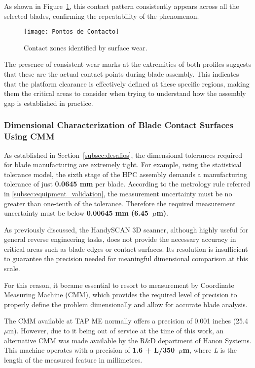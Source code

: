 As shown in Figure~\ref{fig:contact}, this contact pattern consistently appears across all the selected blades, confirming the repeatability of the phenomenon. 

\begin{figure}[H]
    \centering
    \texttt{[image: Pontos de Contacto]}
    \caption{Contact zones identified by surface wear.}
    \label{fig:contact}
\end{figure}

The presence of consistent wear marks at the extremities of both profiles suggests that these are the actual contact points during blade assembly. This indicates that the platform clearance is effectively defined at these specific regions, making them the critical areas to consider when trying to understand how the assembly gap is established in practice.

\subsubsection{Dimensional Characterization of Blade Contact Surfaces Using CMM}
\label{cha:contactocmm}

As established in Section~\ref{subsec:desafios}, the dimensional tolerances required for blade manufacturing are extremely tight. For example, using the statistical tolerance model, the sixth stage of the HPC assembly demands a manufacturing tolerance of just \textbf{0.0645 mm} per blade. According to the metrology rule referred in \ref{subsec:equipment_validation}, the measurement uncertainty must be no greater than one-tenth of the tolerance. Therefore the required measurement uncertainty must be below \textbf{0.00645 mm (6.45~$\mu$m)}.

As previously discussed, the HandySCAN 3D scanner, although highly useful for general reverse engineering tasks, does not provide the necessary accuracy in critical areas such as blade edges or contact surfaces. Its resolution is insufficient to guarantee the precision needed for meaningful dimensional comparison at this scale.

For this reason, it became essential to resort to measurement by Coordinate Measuring Machine (CMM), which provides the required level of precision to properly define the problem dimensionally and allow for accurate blade analysis.

The CMM available at TAP ME normally offers a precision of 0.001 inches (25.4~$\mu$m). However, due to it being out of service at the time of this work, an alternative CMM was made available by the R\&D department of Hanon Systems. This machine operates with a precision of \textbf{1.6 + L/350~$\mu$m}, where \textit{L} is the length of the measured feature in millimetres.

